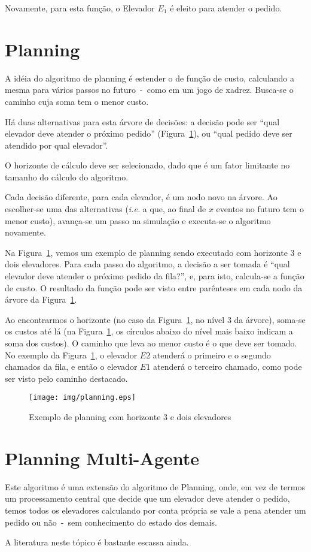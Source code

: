 Novamente, para esta função, o Elevador $E_{1}$ é eleito para atender o pedido.

\section{Planning}


A idéia do algoritmo de planning é estender o de função de custo, calculando a
mesma para vários passos no futuro~-~como em um jogo de xadrez. Busca-se o
caminho cuja soma tem o menor custo.

Há duas alternativas para esta árvore de decisões: a decisão pode ser ``qual
elevador deve atender o próximo pedido'' (Figura~\ref{fig:planning}),
ou ``qual pedido deve ser atendido por qual elevador''. %

O horizonte de cálculo deve ser selecionado, dado que é um fator limitante no
tamanho do cálculo do algoritmo.

Cada decisão diferente, para cada elevador, é um nodo novo na árvore. Ao
escolher-se uma das alternativas (\textit{i.e.} a que, ao final de $x$ eventos
no futuro tem o menor custo), avança-se um passo na simulação e executa-se o
algoritmo novamente.

Na Figura~\ref{fig:planning}, vemos um exemplo de planning sendo executado com
horizonte 3 e dois elevadores. Para cada passo do algoritmo, a decisão a ser
tomada é ``qual elevador deve atender o próximo pedido da fila?'', e, para isto,
calcula-se a função de custo. O resultado da função pode ser visto entre
parênteses em cada nodo da árvore da Figura~\ref{fig:planning}.

Ao encontrarmos o horizonte (no caso da Figura~\ref{fig:planning}, no nível 3 da
árvore), soma-se os custos até lá (na Figura~\ref{fig:planning}, os círculos
abaixo do nível mais baixo indicam a soma dos custos). O caminho que leva ao
menor custo é o que deve ser tomado. No exemplo da Figura~\ref{fig:planning}, o
elevador $E2$ atenderá o primeiro e o segundo chamados da fila, e então o
elevador $E1$ atenderá o terceiro chamado, como pode ser visto pelo caminho destacado.

\begin{figure}[htb!]
  \centering
  \texttt{[image: img/planning.eps]}
  \caption{Exemplo de planning com horizonte 3 e dois elevadores}
\label{fig:planning}
\end{figure}

\section{Planning Multi-Agente}

Este algoritmo é uma extensão do algoritmo de Planning, onde, em vez de termos
um processamento central que decide que um elevador deve atender o pedido, temos
todos os elevadores calculando por conta própria se vale a pena atender um
pedido ou não~-~sem conhecimento do estado dos demais.

A literatura neste tópico é bastante escassa ainda.